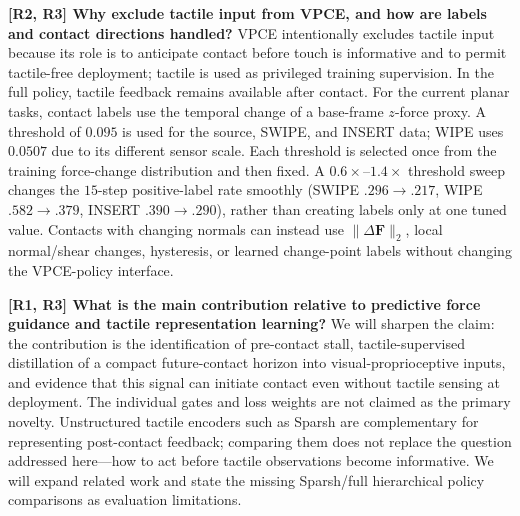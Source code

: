 \documentclass[conference]{IEEEtran}
\newcommand{\newparagraph}[1]{{\bf #1}}
\begin{document}
\newparagraph{[R2, R3] Why exclude tactile input from VPCE, and how are labels
and contact directions handled?}
VPCE intentionally excludes tactile input because its role is to anticipate
contact before touch is informative and to permit tactile-free deployment;
tactile is used as privileged training supervision. In the full policy, tactile
feedback remains available after contact. For the current planar tasks, contact
labels use the temporal change of a base-frame $z$-force proxy. A threshold of
$0.095$ is used for the source, SWIPE, and INSERT data; WIPE uses $0.0507$ due
to its different sensor scale. Each threshold is selected once from the
training force-change distribution and then fixed. A $0.6\!\times$--$1.4\!\times$ threshold sweep
changes the $15$-step positive-label rate smoothly (SWIPE $.296\!\rightarrow
.217$, WIPE $.582\!\rightarrow.379$, INSERT $.390\!\rightarrow.290$), rather
than creating labels only at one tuned value. Contacts with changing normals can instead
use $\lVert\Delta\mathbf{F}\rVert_2$, local normal/shear changes, hysteresis,
or learned change-point labels without changing the VPCE-policy interface.

\newparagraph{[R1, R3] What is the main contribution relative to predictive
force guidance and tactile representation learning?}
We will sharpen the claim: the contribution is the identification of
pre-contact stall, tactile-supervised distillation of a compact future-contact
horizon into visual-proprioceptive inputs, and evidence that this signal can
initiate contact even without tactile sensing at deployment. The individual
gates and loss weights are not claimed as the primary novelty. Unstructured
tactile encoders such as Sparsh are complementary for representing post-contact
feedback; comparing them does not replace the question addressed here---how to
act before tactile observations become informative. We will expand related work
and state the missing Sparsh/full hierarchical policy comparisons as evaluation
limitations.
\end{document}

